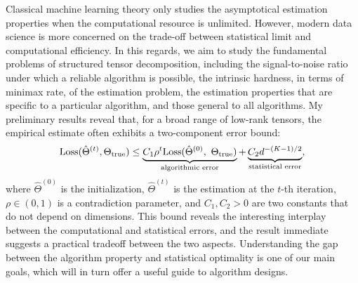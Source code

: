 \documentclass[10pt]{article}
\newcommand*{\KeepStyleUnderBrace}[1]{%
  \mathop{%
    \mathchoice
    {\underbrace{\displaystyle#1}}%
    {\underbrace{\textstyle#1}}%
    {\underbrace{\scriptstyle#1}}%
    {\underbrace{\scriptscriptstyle#1}}%
  }\limits
}
\theoremstyle{definition}
\theoremstyle{definition}
\theoremstyle{definition}
\begin{document}
\begin{enumerate}
Classical machine learning theory only studies the asymptotical estimation properties when the computational resource is unlimited. However, modern data science is more concerned on the trade-off between statistical limit and computational efficiency. In this regards, we aim to study the fundamental problems of structured tensor decomposition, including the signal-to-noise ratio under which a reliable algorithm is possible, the intrinsic hardness, in terms of minimax rate, of the estimation problem, the estimation properties that are specific to a particular algorithm, and those general to all algorithms. My preliminary results reveal that, for a broad range of low-rank tensors, the empirical estimate often exhibits a two-component error bound:
\[
\text{Loss}(\hat \Theta^{(t)}, \Theta_{\text{true}}) \leq \KeepStyleUnderBrace{C_1 \rho^t\text{Loss}(\hat \Theta^{(0)},\ \Theta_{\text{true}})}_{\text{algorithmic error}}+\KeepStyleUnderBrace{C_2 d^{-(K-1)/2}}_{\text{statistical error}},
\]
where $\hat \Theta^{(0)}$ is the initialization, $\hat \Theta^{(t)}$ is the estimation at the $t$-th iteration, $\rho\in(0,1)$ is a contradiction parameter, and $C_1,C_2>0$ are two constants that do not depend on dimensions. This bound reveals the interesting interplay between the computational and statistical errors, and the result immediate suggests a practical tradeoff between the two aspects. Understanding the gap between the algorithm property and statistical optimality is one of our main goals, which will in turn offer a useful guide to algorithm designs.



\end{enumerate}
\end{document}
